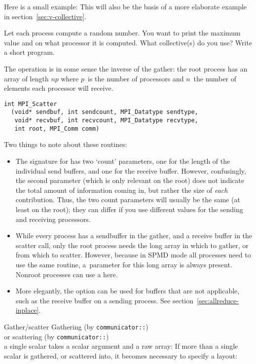 Here is a small example:
This will also be the basis of a more elaborate example in
section~\ref{sec:v-collective}.

\begin{exercise}
  \label{ex:randomwhere}
  Let each process compute a random number.
  You want to print the maximum value and on what processor it
  is computed. What collective(s) do you use? Write a short program.
\end{exercise}

The  operation is in some sense the inverse of the gather:
the root process has an array of length $np$ where $p$~is the number of processors
and $n$~the number of elements each processor will receive.
\begin{lstlisting}
int MPI_Scatter
  (void* sendbuf, int sendcount, MPI_Datatype sendtype, 
   void* recvbuf, int recvcount, MPI_Datatype recvtype, 
   int root, MPI_Comm comm) 
\end{lstlisting}

Two things to note about these routines:
\begin{itemize}
\item The signature for  has two `count' parameters, one
  for the length of the individual send buffers, and one for the receive buffer.
  However, confusingly, the second parameter (which is only relevant on the root)
  does not indicate the total amount of information coming in, but
  rather the size of \emph{each} contribution. Thus, the two count parameters
  will usually be the same (at least on the root); they can differ if you 
  use different  values for the sending and receiving
  processors.
\item While every process has a sendbuffer in the gather, and a receive buffer
  in the scatter call, only the root process needs the long array in which to gather,
  or from which to scatter.
  However, because in \ac{SPMD} mode all processes need to use the same routine,
  a~parameter for this long array is always present. Nonroot processes can use
  a  here.
\item More elegantly, the  option can be
  used for buffers that are not applicable, such as the receive buffer on a sending process.
  See section~\ref{sec:allreduce-inplace}.
\end{itemize}

\begin{mplnote}{Gather/scatter}
  Gathering (by \lstinline+communicator::+)\\
  or scattering (by \lstinline+communicator::+)\\
  a single scalar takes a scalar argument
  and a raw array:
  If more than a single scalar is gathered, or scattered into,
  it becomes necessary to specify a layout:
\end{mplnote}


